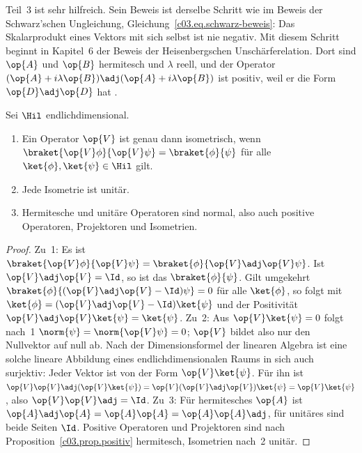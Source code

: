 Teil~3 ist sehr hilfreich. Sein Beweis ist derselbe Schritt wie im Beweis der Schwarz'schen
Ungleichung, Gleichung~\eqref{c03.eq.schwarz-beweis}: Das Skalarprodukt eines Vektors mit sich
selbst ist nie negativ. Mit diesem Schritt beginnt in Kapitel~6 der Beweis der Heisenbergschen
Unschärferelation. Dort sind $\op{A}$ und $\op{B}$ hermitesch und $\lambda$ reell, und der
Operator $(\op{A} + i\lambda\op{B})\adj(\op{A} + i\lambda\op{B})$ ist positiv, weil er die Form
$\op{D}\adj\op{D}$ hat .

\begin{proposition}\label{c03.prop.isometrie}
  Sei $\Hil$ endlichdimensional.
  \begin{enumerate}
    \item Ein Operator $\op{V}$ ist genau dann isometrisch, wenn
      $\braket{\op{V}\phi}{\op{V}\psi} = \braket{\phi}{\psi}$ für alle
      $\ket{\phi}, \ket{\psi} \in \Hil$ gilt.
    \item Jede Isometrie ist unitär.
    \item Hermitesche und unitäre Operatoren sind normal, also auch positive Operatoren,
      Projektoren und Isometrien.
  \end{enumerate}
\end{proposition}
\begin{proof}
  Zu~1: Es ist $\braket{\op{V}\phi}{\op{V}\psi} = \braket{\phi}{\op{V}\adj\op{V}\psi}$. Ist
  $\op{V}\adj\op{V} = \Id$, so ist das $\braket{\phi}{\psi}$. Gilt umgekehrt
  $\braket{\phi}{(\op{V}\adj\op{V} - \Id)\psi} = 0$ für alle $\ket{\phi}$, so folgt mit
  $\ket{\phi} = (\op{V}\adj\op{V} - \Id)\ket{\psi}$ und der Positivität
  $\op{V}\adj\op{V}\ket{\psi} = \ket{\psi}$. Zu~2: Aus $\op{V}\ket{\psi} = 0$ folgt nach~1
  $\norm{\psi} = \norm{\op{V}\psi} = 0$; $\op{V}$ bildet also nur den Nullvektor auf null ab.
  Nach der Dimensionsformel der linearen Algebra ist eine solche lineare Abbildung eines
  endlichdimensionalen Raums in sich auch surjektiv: Jeder Vektor ist von der Form
  $\op{V}\ket{\psi}$. Für ihn ist
  $\op{V}\op{V}\adj(\op{V}\ket{\psi}) = \op{V}(\op{V}\adj\op{V})\ket{\psi} = \op{V}\ket{\psi}$,
  also $\op{V}\op{V}\adj = \Id$. Zu~3: Für hermitesches $\op{A}$ ist
  $\op{A}\adj\op{A} = \op{A}\op{A} = \op{A}\op{A}\adj$, für unitäres sind beide Seiten $\Id$.
  Positive Operatoren und Projektoren sind nach Proposition~\ref{c03.prop.positiv} hermitesch,
  Isometrien nach~2 unitär.
\end{proof}

